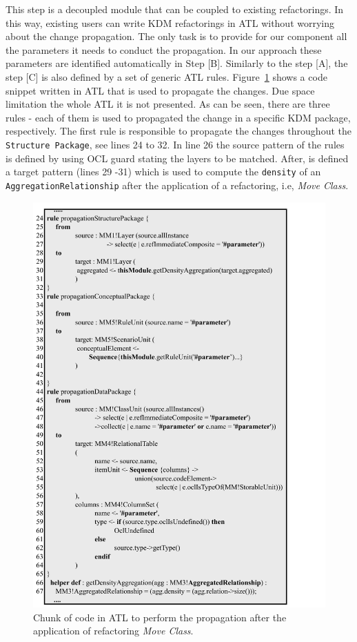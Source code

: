 This step is a decoupled module that can be coupled to existing refactorings. In this way, existing users can write KDM refactorings in ATL without worrying about the change propagation. The only task is to provide for our component all the parameters it needs to conduct the propagation. In our approach these parameters are identified automatically in Step [B].
%
%
Similarly to the step [A], the step [C] is also defined by a set of generic ATL rules. Figure~\ref{fig:ATLPropagation} shows a code snippet written in ATL that is used to propagate the changes. Due space limitation the whole ATL it is not presented. As can be seen, there are three rules - each of them is used to propagated the change in a specific KDM package, respectively. The first rule is responsible to propagate the changes throughout the \texttt{Structure Package}, see lines 24 to 32. In line 26 the source pattern of the rules is defined by using OCL guard stating the layers to be matched. After, is defined a target pattern (lines 29 -31) which is used to compute the \texttt{density} of an \texttt{AggregationRelationship} after the application of a refactoring, i.e, \textit{Move Class}.

\begin{figure}[h]	
	\centering
	\includegraphics[scale=0.516]{figuras/ATLPRopagationSBESFormatted}
	\caption{Chunk of code in ATL to perform the propagation after the application of refactoring \textit{Move Class}.}
	\label{fig:ATLPropagation}
\end{figure}

